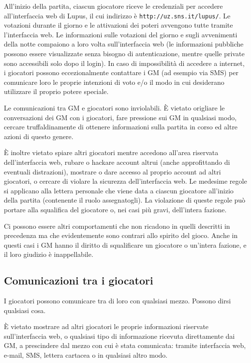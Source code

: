 \documentclass[a4paper,10pt]{article}
\begin{document}
All'inizio della partita, ciascun giocatore riceve le credenziali per accedere all'interfaccia web di Lupus, il cui indirizzo è \verb|http://uz.sns.it/lupus/|.
Le votazioni durante il giorno e le attivazioni dei poteri avvengono tutte tramite l'interfaccia web. Le informazioni sulle votazioni del giorno e sugli avvenimenti della notte compaiono a loro volta sull'interfaccia web (le informazioni pubbliche possono essere visualizzate senza bisogno di autenticazione, mentre quelle private sono accessibili solo dopo il login). In caso di impossibilità di accedere a internet, i giocatori possono eccezionalmente contattare i GM (ad esempio via SMS) per comunicare loro le proprie intenzioni di voto e/o il modo in cui desiderano utilizzare il proprio potere speciale.

Le comunicazioni tra GM e giocatori sono inviolabili. È vietato origliare le conversazioni dei GM con i giocatori, fare pressione sui GM in qualsiasi modo, cercare truffaldinamente di ottenere informazioni sulla partita in corso ed altre azioni di questo genere.

È inoltre vietato spiare altri giocatori mentre accedono all'area riservata dell'interfaccia web, rubare o hackare account altrui (anche approfittando di eventuali distrazioni), mostrare o dare accesso al proprio account ad altri giocatori, o cercare di violare la sicurezza dell'interfaccia web. Le medesime regole si applicano alla lettera personale che viene data a ciascun giocatore all'inizio della partita (contenente il ruolo assegnatogli). La violazione di queste regole può portare alla squalifica del giocatore o, nei casi più gravi, dell'intera fazione.

Ci possono essere altri comportamenti che non ricadono in quelli descritti in precedenza ma che evidentemente sono contrari allo spirito del gioco. Anche in questi casi i GM hanno il diritto di squalificare un giocatore o un'intera fazione, e il loro giudizio è inappellabile.


\subsection{Comunicazioni tra i giocatori}

I giocatori possono comunicare tra di loro con qualsiasi mezzo. Possono dirsi qualsiasi cosa.

È vietato mostrare ad altri giocatori le proprie informazioni riservate sull'interfaccia web, o qualsiasi tipo di informazione ricevuta direttamente dai GM, a prescindere dal mezzo con cui è stata comunicata: tramite interfaccia web, e-mail, SMS, lettera cartacea o in qualsiasi altro modo.
\end{document}
